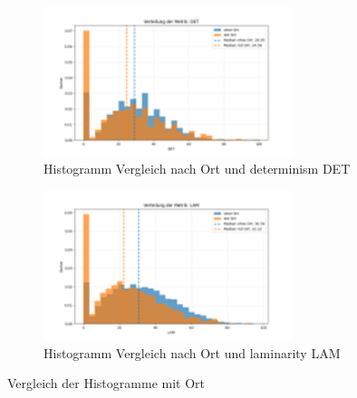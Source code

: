 \documentclass[
    language=german, %
    thesis=seminar, %
    supervisor=postdoc, %
    multiauthor=true, %
    ]{settings/csssa-thesis}
\begin{document}
\begin{figure}[ht]
    \centering
    \begin{subfigure}{0.49\textwidth}
        \centering
        \includegraphics[width=0.8\textwidth]{figures/Bild24.png}
        \caption{Histogramm Vergleich nach Ort und determinism DET }\label{fig:Bild20a}
    \end{subfigure}
    \begin{subfigure}{0.49\textwidth}
        \centering
        \includegraphics[width=0.8\textwidth]{figures/Bild25.png}
        \caption{Histogramm Vergleich nach Ort und laminarity LAM}\label{fig:Bild20b}
    \end{subfigure}\label{fig:Bild20}
    \caption{Vergleich der Histogramme mit Ort}
\end{figure}
\end{document}
